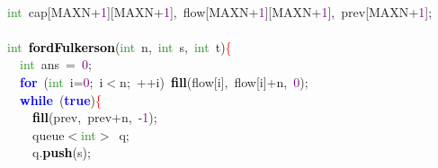 
{\ttfamily \raggedright {
\noindent
\mbox{} \\
\mbox{}\textcolor{ForestGreen}{int}\ cap\textcolor{BrickRed}{[}MAXN\textcolor{BrickRed}{+}\textcolor{Purple}{1}\textcolor{BrickRed}{][}MAXN\textcolor{BrickRed}{+}\textcolor{Purple}{1}\textcolor{BrickRed}{],}\ flow\textcolor{BrickRed}{[}MAXN\textcolor{BrickRed}{+}\textcolor{Purple}{1}\textcolor{BrickRed}{][}MAXN\textcolor{BrickRed}{+}\textcolor{Purple}{1}\textcolor{BrickRed}{],}\ prev\textcolor{BrickRed}{[}MAXN\textcolor{BrickRed}{+}\textcolor{Purple}{1}\textcolor{BrickRed}{];} \\
\mbox{} \\
\mbox{}\textcolor{ForestGreen}{int}\ \textbf{\textcolor{Black}{fordFulkerson}}\textcolor{BrickRed}{(}\textcolor{ForestGreen}{int}\ n\textcolor{BrickRed}{,}\ \textcolor{ForestGreen}{int}\ s\textcolor{BrickRed}{,}\ \textcolor{ForestGreen}{int}\ t\textcolor{BrickRed}{)}\textcolor{Red}{\{} \\
\mbox{}\ \ \textcolor{ForestGreen}{int}\ ans\ \textcolor{BrickRed}{=}\ \textcolor{Purple}{0}\textcolor{BrickRed}{;} \\
\mbox{}\ \ \textbf{\textcolor{Blue}{for}}\ \textcolor{BrickRed}{(}\textcolor{ForestGreen}{int}\ i\textcolor{BrickRed}{=}\textcolor{Purple}{0}\textcolor{BrickRed}{;}\ i\textcolor{BrickRed}{$<$}n\textcolor{BrickRed}{;}\ \textcolor{BrickRed}{++}i\textcolor{BrickRed}{)}\ \textbf{\textcolor{Black}{fill}}\textcolor{BrickRed}{(}flow\textcolor{BrickRed}{[}i\textcolor{BrickRed}{],}\ flow\textcolor{BrickRed}{[}i\textcolor{BrickRed}{]+}n\textcolor{BrickRed}{,}\ \textcolor{Purple}{0}\textcolor{BrickRed}{);} \\
\mbox{}\ \ \textbf{\textcolor{Blue}{while}}\ \textcolor{BrickRed}{(}\textbf{\textcolor{Blue}{true}}\textcolor{BrickRed}{)}\textcolor{Red}{\{} \\
\mbox{}\ \ \ \ \textbf{\textcolor{Black}{fill}}\textcolor{BrickRed}{(}prev\textcolor{BrickRed}{,}\ prev\textcolor{BrickRed}{+}n\textcolor{BrickRed}{,}\ \textcolor{BrickRed}{-}\textcolor{Purple}{1}\textcolor{BrickRed}{);} \\
\mbox{}\ \ \ \ queue\textcolor{BrickRed}{$<$}\textcolor{ForestGreen}{int}\textcolor{BrickRed}{$>$}\ q\textcolor{BrickRed}{;} \\
\mbox{}\ \ \ \ q\textcolor{BrickRed}{.}\textbf{\textcolor{Black}{push}}\textcolor{BrickRed}{(}s\textcolor{BrickRed}{);} \\
}}
